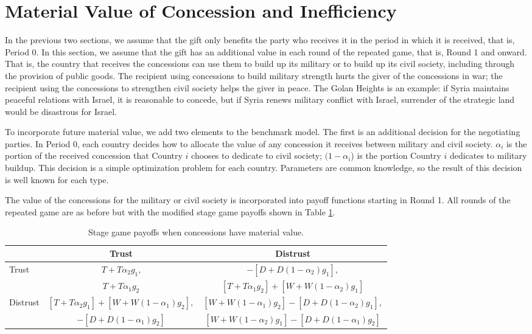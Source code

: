 \documentclass[bibtex,autowc]{apsr_submission}
\begin{document}
\section{Material Value of Concession and Inefficiency} 
\label{sec:IC}

In the previous two sections, we assume that the gift only benefits the party who receives it in the period in which it is received, that is, Period 0. In this section, we assume that the gift has an additional value in each round of the repeated game, that is, Round 1 and onward. That is, the country that receives the concessions can use them to build up its military or to build up its civil society, including through the provision of public goods. The recipient using concessions to build military strength hurts the giver of the concessions in war; the recipient using the concessions to strengthen civil society helps the giver in peace. The Golan Heights is an example: if Syria maintains peaceful relations with Israel, it is reasonable to concede, but if Syria renews military conflict with Israel, surrender of the strategic land would be disastrous for Israel. 

To incorporate future material value, we add two elements to the benchmark model. The first is an additional decision for the negotiating parties. In Period 0, each country decides how to allocate the value of any concession it receives between military and civil society. $\alpha_i$ is the portion of the received concession that Country $i$ chooses to dedicate to civil society; $(1- \alpha_i$) is the portion Country $i$ dedicates to military buildup. This decision is a simple optimization problem for each country. Parameters are common knowledge, so the result of this decision is well known for each type.

The value of the concessions for the military or civil society is incorporated into payoff functions starting in Round 1. All rounds of the repeated game are as before but with the modified stage game payoffs shown in Table \ref{tab-2}.

\begin{table}[hbt!]
    \centering
    \caption{Stage game payoffs when concessions have material value.}
    \begin{tabular}{l|c|c}\label{tab-2}
      & Trust & Distrust \\ \hline
	 Trust& \small$T+T\alpha_2 g_1$, & \small$-[D+D(1-\alpha_2) g_1],$ \\
  & \small$T+T\alpha_1 g_2$ & \small$[T+T\alpha_1 g_2] + [W+W(1-\alpha_2) g_1] $\\ \hline
	Distrust & \small$[T+T\alpha_2 g_1]+[W+W(1-\alpha_1) g_2],$& \small$[W+W(1-\alpha_1) g_2]-[D+D(1-\alpha_2) g_1],$\\ 
	 & \small$-[D+D(1-\alpha_1) g_2] $ & \small$[W+W(1-\alpha_2) g_1]-[D+D(1-\alpha_1) g_2]$
    \end{tabular}
\end{table}
\end{document}
